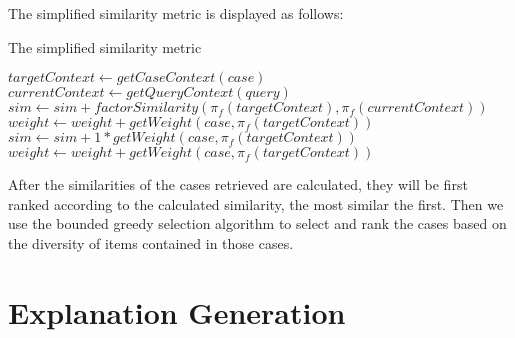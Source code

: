 The simplified similarity metric is displayed as follows:
\begin{algorithm}
\caption{The simplified similarity metric}
\label{list:similarity}
\begin{algorithmic}
	\State $targetContext \gets getCaseContext(case)$
	\State $currentContext \gets getQueryContext(query)$
			\State $sim \gets sim +  factorSimilarity(\pi_f(targetContext), \pi_f(currentContext))$
			\State $weight \gets weight + getWeight(case,\pi_f(targetContext))$
		\Else
			\State $sim \gets sim +  1*getWeight(case,\pi_f(targetContext))$
			\State $weight \gets weight + getWeight(case,\pi_f(targetContext))$
		\EndIf
	\EndFor
\EndFunction
\end{algorithmic}
\end{algorithm}

After the similarities of the cases retrieved are calculated, they will be first ranked according to the calculated similarity, the most similar the first. Then we use the bounded greedy selection algorithm to select and rank the cases based on the diversity of items contained in those cases. 

\section{Explanation Generation} \label{sec:eg}


